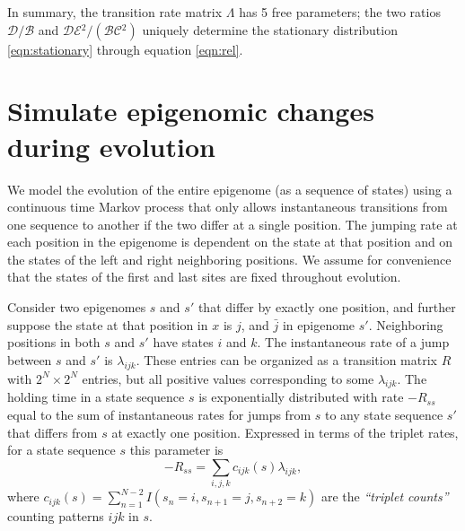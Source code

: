 \documentclass[11pt]{article}
\newcommand{\birth}{\ensuremath{\mathcal{B}}}
\newcommand{\death}{\ensuremath{\mathcal{D}}}
\newcommand{\expansion}{\ensuremath{\mathcal{E}}}
\newcommand{\contraction}{\ensuremath{\mathcal{C}}}
\begin{document}
In summary, the transition rate matrix $\Lambda$ has 5 free
parameters; the two ratios $\death{}/\birth{}$ and
$\death{}\expansion{}^2/(\birth{}\contraction{}^2)$ uniquely
determine the stationary distribution \eqref{eqn:stationary} through
equation \eqref{eqn:rel}.

\section{Simulate epigenomic changes during evolution}


We model the evolution of the entire epigenome (as a sequence of
states) using a continuous time Markov process that only allows
instantaneous transitions from one sequence to another if the two
differ at a single position. The jumping rate at each position in the
epigenome is dependent on the state at that position and on the states
of the left and right neighboring positions. We assume for convenience
that the states of the first and last sites are fixed throughout
evolution.

Consider two epigenomes $s$ and $s'$ that differ by exactly one
position, and further suppose the state at that position in $x$ is
$j$, and $\bar{j}$ in epigenome $s'$. Neighboring positions in both
$s$ and $s'$ have states $i$ and $k$. The instantaneous rate of a jump
between $s$ and $s'$ is $\lambda_{ijk}$. These entries can be
organized as a transition matrix $R$ with $2^N\times 2^N$ entries, but
all positive values corresponding to some $\lambda_{ijk}$. The holding
time in a state sequence $s$ is exponentially distributed with rate
$-R_{ss}$ equal to the sum of instantaneous rates for jumps from $s$
to any state sequence $s'$ that differs from $s$ at exactly one
position. Expressed in terms of the triplet rates, for a state
sequence $s$ this parameter is
\[
-R_{ss} = \sum_{i,j,k}c_{ijk}(s)\lambda_{ijk},
\]
where $c_{ijk}(s) = \sum_{n=1}^{N-2}I(s_{n}=i, s_{n+1}=j, s_{n+2}=k)$
are the {\it ``triplet counts''} counting patterns $ijk$ in $s$.
\end{document}
